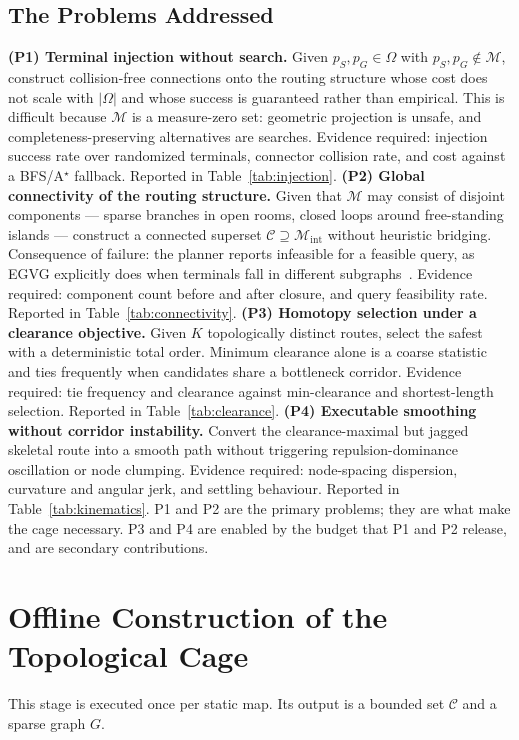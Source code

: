 \documentclass[conference]{IEEEtran}
\begin{document}
\subsection{The Problems Addressed}
\textbf{(P1) Terminal injection without search.} Given $p_S,p_G\in\Omega$ with $p_S,p_G\notin\mathcal{M}$, construct collision-free connections onto the routing structure whose cost does not scale with $|\Omega|$ and whose success is guaranteed rather than empirical. This is difficult because $\mathcal{M}$ is a measure-zero set: geometric projection is unsafe, and completeness-preserving alternatives are searches. Evidence required: injection success rate over randomized terminals, connector collision rate, and cost against a BFS/A$^\star$ fallback. Reported in Table~\ref{tab:injection}.
\textbf{(P2) Global connectivity of the routing structure.} Given that $\mathcal{M}$ may consist of disjoint components --- sparse branches in open rooms, closed loops around free-standing islands --- construct a connected superset $\mathcal{C}\supseteq\mathcal{M}_{\mathrm{int}}$ without heuristic bridging. Consequence of failure: the planner reports infeasible for a feasible query, as EGVG explicitly does when terminals fall in different subgraphs~\cite{qi2025egvg}. Evidence required: component count before and after closure, and query feasibility rate. Reported in Table~\ref{tab:connectivity}.
\textbf{(P3) Homotopy selection under a clearance objective.} Given $K$ topologically distinct routes, select the safest with a deterministic total order. Minimum clearance alone is a coarse statistic and ties frequently when candidates share a bottleneck corridor. Evidence required: tie frequency and clearance against min-clearance and shortest-length selection. Reported in Table~\ref{tab:clearance}.
\textbf{(P4) Executable smoothing without corridor instability.} Convert the clearance-maximal but jagged skeletal route into a smooth path without triggering repulsion-dominance oscillation or node clumping. Evidence required: node-spacing dispersion, curvature and angular jerk, and settling behaviour. Reported in Table~\ref{tab:kinematics}.
P1 and P2 are the primary problems; they are what make the cage necessary. P3 and P4 are enabled by the budget that P1 and P2 release, and are secondary contributions.
\section{Offline Construction of the Topological Cage}
\label{sec:offline}
This stage is executed once per static map. Its output is a bounded set $\mathcal{C}$ and a sparse graph $G$.
\end{document}
